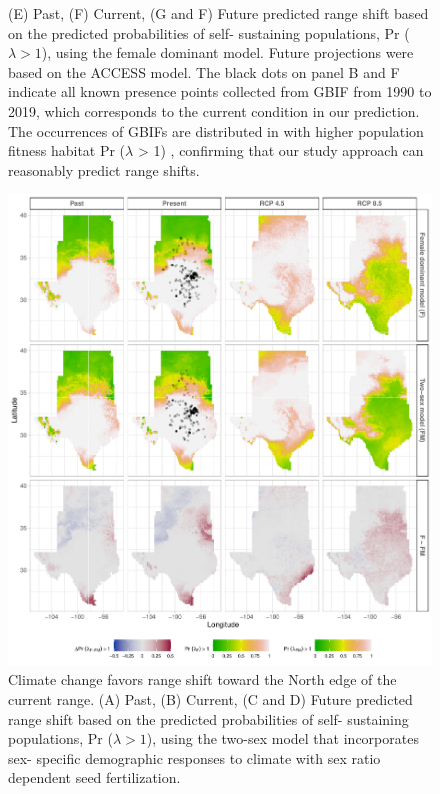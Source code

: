\documentclass[12pt]{article}\usepackage[]{graphicx}\usepackage[dvipsnames]{xcolor}
\begin{document}
\begin{figure}[H]
\begin{center}
{			(E) Past, (F) Current, (G and F) Future  predicted range shift based on the predicted probabilities of self- sustaining populations, Pr ($\lambda > 1$), using the female dominant model.
			Future projections were based on the  ACCESS model.
			The black dots on panel B and F indicate all known presence points collected from GBIF from 1990 to 2019, which corresponds to the current condition in our prediction. 
			The occurrences of GBIFs are distributed in with higher population fitness habitat Pr ($\lambda$ > 1) , confirming that our study approach can reasonably predict range shifts.}
		\label{Sup:geoprojacc}
	\end{center}
\end{figure}

\begin{figure}[H]
	\begin{center}
		\includegraphics[width=0.95\linewidth]{Figures/Fig_geoPrlambda_miroc.pdf}
		\caption{Climate change favors range shift toward the North edge of the current range.
			(A) Past, (B) Current, (C and D) Future predicted range shift based on the predicted probabilities of self- sustaining populations, Pr ($\lambda > 1$), using the two-sex model that incorporates sex- specific demographic responses to climate with sex ratio dependent seed fertilization.
}
\end{center}
\end{figure}
\end{document}
